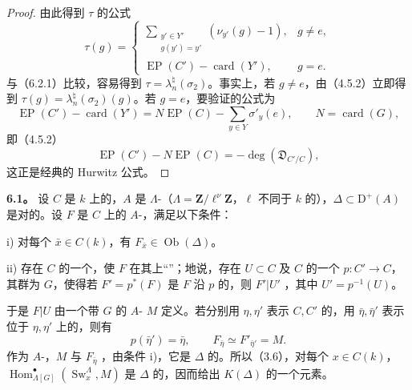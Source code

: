 \begin{proof}
由此得到 $\tau$ 的公式
\[
\tau(g)=
\begin{cases}
\displaystyle\sum_{\substack{y'\in Y'\\g(y')=y'}}(\nu_{y'}(g)-1),&g\ne e,\\
\operatorname{EP}(C')-\operatorname{card}(Y'),&g=e.
\end{cases}\tag{5.2.2}
\]
与（6.2.1）比较，容易得到 $\tau=\lambda_n^\natural(\sigma_2)$。事实上，若 $g\ne e$，由（4.5.2）立即得到 $\tau(g)=\lambda_n^\natural(\sigma_2)(g)$。若 $g=e$，要验证的公式为
\[
\operatorname{EP}(C')-\operatorname{card}(Y')
=N\operatorname{EP}(C)-\sum_{y\in Y}\sigma'_y(e),
\qquad N=\operatorname{card}(G),
\]
即（4.5.2）
\[
\operatorname{EP}(C')-N\operatorname{EP}(C)
=-\deg(\mathfrak D_{C'/C}),
\]
这正是经典的 Hurwitz 公式。
\end{proof}

\textbf{6.1。} 设 $C$ 是 $k$ 上的，$A$ 是 $\Lambda$-（$\Lambda=\mathbf Z/\ell^\nu\mathbf Z$，$\ell$ 不同于 $k$ 的），$\Delta\subset\mathrm D^+(A)$ 是对的。设 $F$ 是 $C$ 上的 $A$-，满足以下条件：

i) 对每个 $\bar x\in C(k)$，有 $F_{\bar x}\in\operatorname{Ob}(\Delta)$。

ii) 存在 $C$ 的一个，使 $F$ 在其上“”；地说，存在 $U\subset C$ 及 $C$ 的一个 $p:C'\longrightarrow C$，其群为 $G$，使得若 $F'=p^*(F)$ 是 $F$ 沿 $p$ 的，则 $F'|U'$ ，其中 $U'=p^{-1}(U)$。

于是 $F|U$ 由一个带 $G$ 的 $A$- $M$ 定义。若分别用 $\eta,\eta'$ 表示 $C,C'$ 的，用 $\bar\eta,\bar\eta'$ 表示位于 $\eta,\eta'$ 上的，则有
\[
p(\bar\eta')=\bar\eta,\qquad
F_{\bar\eta}\simeq F'_{\bar\eta'}=M.\tag{6.1.1}
\]
作为 $A$-，$M$ 与 $F_{\bar\eta}$ ，由条件 i)，它是 $\Delta$ 的。所以（3.6），对每个 $x\in C(k)$，$\operatorname{Hom}_{\Lambda[G]}^\bullet(\operatorname{Sw}_x^\Lambda,M)$ 是 $\Delta$ 的，因而给出 $K(\Delta)$ 的一个元素。

